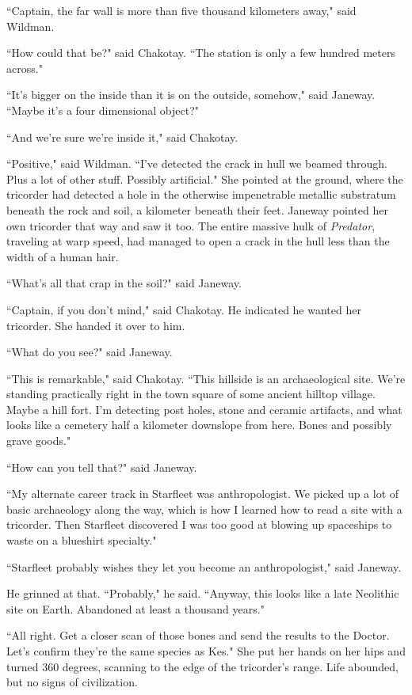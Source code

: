 \documentclass[twoside,letterpaper,12pt]{memoir}
\begin{document}
``Captain, the far wall is more than five thousand kilometers away," said Wildman. 

``How could that be?" said Chakotay. ``The station is only a few hundred meters across." 

``It's bigger on the inside than it is on the outside, somehow," said Janeway. ``Maybe it’s a four dimensional object?" 

``And we're sure we're inside it," said Chakotay. 

``Positive," said Wildman. ``I've detected the crack in hull we beamed through. Plus a lot of other stuff. Possibly artificial." She pointed at the ground, where the tricorder had detected a hole in the otherwise impenetrable metallic substratum beneath the rock and soil, a kilometer beneath their feet. Janeway pointed her own tricorder that way and saw it too. The entire massive hulk of \textit{Predator}, traveling at warp speed, had managed to open a crack in the hull less than the width of a human hair. 

``What's all that crap in the soil?" said Janeway. 

``Captain, if you don't mind," said Chakotay. He indicated he wanted her tricorder. She handed it over to him. 

``What do you see?" said Janeway. 

``This is remarkable," said Chakotay. ``This hillside is an archaeological site. We're standing practically right in the town square of some ancient hilltop village. Maybe a hill fort. I'm detecting post holes, stone and ceramic artifacts, and what looks like a cemetery half a kilometer downslope from here. Bones and possibly grave goods." 

``How can you tell that?" said Janeway. 

``My alternate career track in Starfleet was anthropologist. We picked up a lot of basic archaeology along the way, which is how I learned how to read a site with a tricorder. Then Starfleet discovered I was too good at blowing up spaceships to waste on a blueshirt specialty." 

``Starfleet probably wishes they let you become an anthropologist," said Janeway. 

He grinned at that. ``Probably," he said. ``Anyway, this looks like a late Neolithic site on Earth. Abandoned at least a thousand years." 

``All right. Get a closer scan of those bones and send the results to the Doctor. Let's confirm they're the same species as Kes." She put her hands on her hips and turned 360 degrees, scanning to the edge of the tricorder’s range. Life abounded, but no signs of civilization. 
\end{document}
